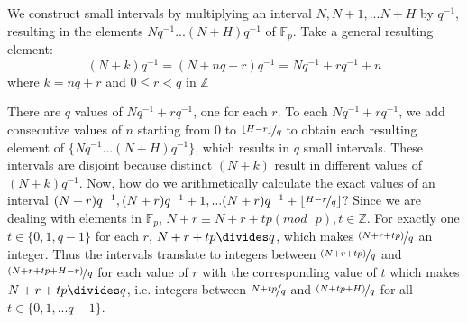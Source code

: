 \documentclass{report}
\begin{document}
We construct small intervals by multiplying an interval $N,N+1,...N+H$ by $q^{-1}$, resulting in the elements $Nq^{-1}...(N+H)q^{-1}$ of $\mathbb{F}_p$. Take a general resulting element:
$$(N+k)q^{-1}=(N+nq+r)q^{-1}=Nq^{-1}+rq^{-1}+n$$
where $k=nq+r$ and $0\leq r<q$ in $\mathbb{Z}$

There are $q$ values of $Nq^{-1}+rq^{-1}$, one for each $r$. To each $Nq^{-1}+rq^{-1}$, we add consecutive values of $n$ starting from $0$ to $\nicefrac{\lfloor H-r\rfloor}{q}$ to obtain each resulting element of $\{Nq^{-1}...(N+H)q^{-1}\}$, which results in $q$ small intervals. These intervals are disjoint because distinct $(N+k)$ result in different values of $(N+k)q^{-1}$. Now, how do we arithmetically calculate the exact values of an interval $(N+r)q^{-1},(N+r)q^{-1}+1,...(N+r)q^{-1}+\lfloor\nicefrac{H-r}{q}\rfloor$? Since we are dealing with elements in $\mathbb{F}_p$, $N+r\equiv N+r+tp (mod\text{ }p), t\in \mathbb{Z}$. For exactly one $t\in\{0, 1, q-1\}$ for each $r$, $N+r+tp\divides q$, which makes $\nicefrac{(N+r+tp)}{q}$ an integer. Thus the intervals translate to integers between $\nicefrac{(N+r+tp)}{q}$ and $\nicefrac{(N+r+tp+H-r)}{q}$ for each value of $r$ with the corresponding value of $t$ which makes $N+r+tp\divides q$, i.e. integers between $\nicefrac{N+tp}{q}$ and $\nicefrac{(N+tp+H)}{q}$ for all $t\in\{0,1,...q-1\}$.
\end{document}
